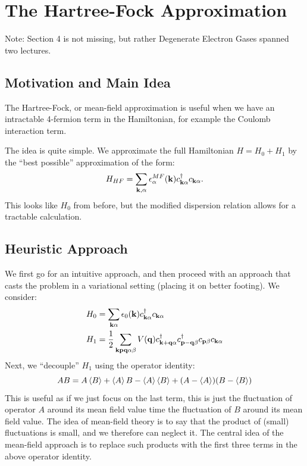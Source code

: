 \section{The Hartree-Fock Approximation}
Note: Section 4 is not missing, but rather Degenerate Electron Gases spanned two lectures. 

\subsection{Motivation and Main Idea}
The Hartree-Fock, or mean-field approximation is useful when we have an intractable 4-fermion term in the Hamiltonian, for example the Coulomb interaction term.

The idea is quite simple. We approximate the full Hamiltonian $H = H_0 + H_1$ by the ``best possible'' approximation of the form:
\begin{equation}
    H_{HF} = \sum_{\mathbf{k}, \alpha}\epsilon_{\alpha}^{MF}(\mathbf{k})c_{\mathbf{k}\alpha}^\dagger c_{\mathbf{k}\alpha}.
\end{equation}
This looks like $H_0$ from before, but the modified dispersion relation allows for a tractable calculation.

\subsection{Heuristic Approach}
We first go for an intuitive approach, and then proceed with an approach that casts the problem in a variational setting (placing it on better footing). We consider:
\begin{equation}
    \begin{split}
        H_0 &= \sum_{\mathbf{k}\alpha}\epsilon_0(\mathbf{k})c_{\mathbf{k}\alpha}^\dagger c_{\mathbf{k}\alpha}
        \\ H_1 &= \frac{1}{2}\sum_{\mathbf{kpq}\alpha\beta}V(\mathbf{q})c^\dagger_{\mathbf{k} + \mathbf{q}\alpha}c^\dagger_{\mathbf{p} - \mathbf{q}\beta}c_{\mathbf{p}\beta}c_{\mathbf{k}\alpha}
    \end{split}
\end{equation}
Next, we ``decouple'' $H_1$ using the operator identity:
\begin{equation}
    AB = A\left< B \right> + \left< A \right>B - \left< A \right>\left< B \right> + (A - \left< A \right>)(B - \left< B \right>)
\end{equation}
This is useful as if we just focus on the last term, this is just the fluctuation of operator $A$ around its mean field value time the fluctuation of $B$ around its mean field value. The idea of mean-field theory is to say that the product of (small) fluctuations is small, and we therefore can neglect it. The central idea of the mean-field approach is to replace such products with the first three terms in the above operator identity.

